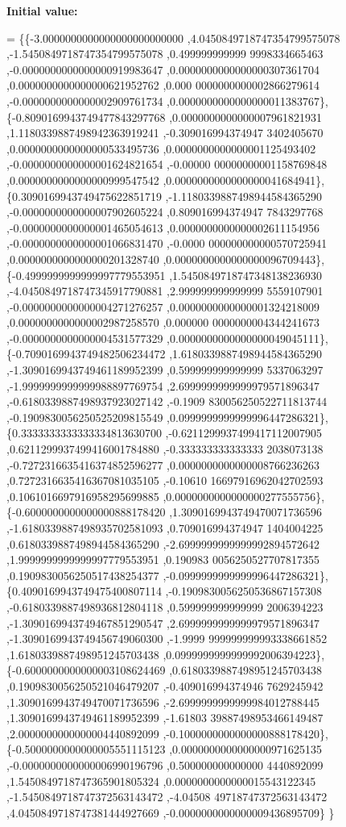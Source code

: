 {\bfseries Initial value\+:}
\begin{DoxyCode}
= \{\{-3.0000000000000000000000000 ,4.0450849718747354799575078 ,-1.5450849718747354799575078 ,0.499999999999
      9998334665463 ,-0.0000000000000000919983647 ,0.0000000000000000307361704 ,0.0000000000000000621952762 ,0.000
      0000000000002866279614 ,-0.0000000000000002909761734 ,0.0000000000000000011383767\},
\{-0.8090169943749477843297768 ,0.0000000000000007961821931 ,1.1180339887498942363919241 ,-0.309016994374947
      3402405670 ,0.0000000000000000533495736 ,0.0000000000000001125493402 ,-0.0000000000000001624821654 ,-0.00000
      00000000001158769848 ,0.0000000000000000999547542 ,0.0000000000000000041684941\},
\{0.3090169943749475622851719 ,-1.1180339887498944584365290 ,-0.0000000000000007902605224 ,0.809016994374947
      7843297768 ,-0.0000000000000001465054613 ,0.0000000000000002611154956 ,-0.0000000000000001066831470 ,-0.0000
      000000000000570725941 ,0.0000000000000000201328740 ,0.0000000000000000096709443\},
\{-0.4999999999999997779553951 ,1.5450849718747348138236930 ,-4.0450849718747345917790881 ,2.999999999999999
      5559107901 ,-0.0000000000000004271276257 ,0.0000000000000001324218009 ,0.0000000000000002987258570 ,0.000000
      0000000004344241673 ,-0.0000000000000004531577329 ,0.0000000000000000049045111\},
\{-0.7090169943749482506234472 ,1.6180339887498944584365290 ,-1.3090169943749461189952399 ,0.599999999999999
      5337063297 ,-1.9999999999999988897769754 ,2.6999999999999979571896347 ,-0.6180339887498937923027142 ,-0.1909
      830056250522711813744 ,-0.1909830056250525209815549 ,0.0999999999999996447286321\},
\{0.3333333333333334813630700 ,-0.6211299937499417112007905 ,0.6211299937499416001784880 ,-0.333333333333333
      2038073138 ,-0.7272316635416374852596277 ,0.0000000000000008766236263 ,0.7272316635416367081035105 ,-0.10610
      16697916962042702593 ,0.1061016697916958295699885 ,0.0000000000000000277555756\},
\{-0.6000000000000000888178420 ,1.3090169943749470071736596 ,-1.6180339887498935702581093 ,0.709016994374947
      1404004225 ,0.6180339887498944584365290 ,-2.6999999999999992894572642 ,1.9999999999999997779553951 ,0.190983
      0056250527707817355 ,0.1909830056250517438254377 ,-0.0999999999999996447286321\},
\{0.4090169943749475400807114 ,-0.1909830056250536867157308 ,-0.6180339887498936812804118 ,0.599999999999999
      2006394223 ,-1.3090169943749467851290547 ,2.6999999999999979571896347 ,-1.3090169943749456749060300 ,-1.9999
      999999999993338661852 ,1.6180339887498951245703438 ,0.0999999999999992006394223\},
\{-0.6000000000000003108624469 ,0.6180339887498951245703438 ,0.1909830056250521046479207 ,-0.409016994374946
      7629245942 ,1.3090169943749470071736596 ,-2.6999999999999984012788445 ,1.3090169943749461189952399 ,-1.61803
      39887498953466149487 ,2.0000000000000004440892099 ,-0.1000000000000000888178420\},
\{-0.5000000000000005551115123 ,0.0000000000000000971625135 ,-0.0000000000000006990196796 ,0.500000000000000
      4440892099 ,1.5450849718747365901805324 ,0.0000000000000015543122345 ,-1.5450849718747372563143472 ,-4.04508
      49718747372563143472 ,4.0450849718747381444927669 ,-0.0000000000000009436895709\}
\}
\end{DoxyCode}

